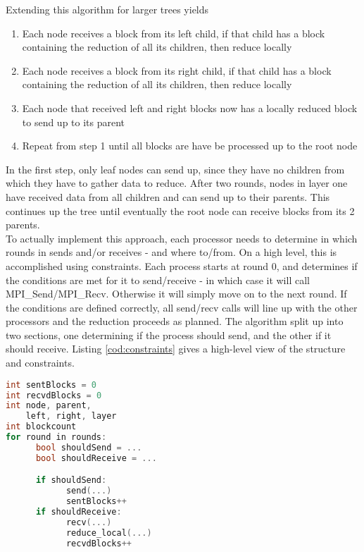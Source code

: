\documentclass[twoside,twocolumn,hidelinks]{article}
\begin{document}
Extending this algorithm for larger trees yields

\begin{enumerate}
      \item Each node receives a block from its left child, if that child has a block containing the reduction of all its children, then reduce locally
      \item Each node receives a block from its right child, if that child has a block containing the reduction of all its children, then reduce locally
      \item Each node that received left and right blocks now has a locally reduced block to send up to its parent 
      \item Repeat from step 1 until all blocks are have be processed up to the root node
\end{enumerate}

In the first step, only leaf nodes can send up, since they have no children from which they have to gather data to reduce. After two rounds, nodes in layer one have received data from all children and can send up to their parents. This continues up the tree until eventually the root node can receive blocks from its 2 parents. \\

To actually implement this approach, each processor needs to determine in which rounds in sends and/or receives - and where to/from. On a high level, this is accomplished using constraints. Each process starts at round 0, and determines if the conditions are met for it to send/receive - in which case it will call MPI\_Send/MPI\_Recv. Otherwise it will simply move on to the next round. If the conditions are defined correctly, all send/recv calls will line up with the other processors and the reduction proceeds as planned. The algorithm split up into two sections, one determining if the process should send, and the other if it should receive. Listing \ref{cod:constraints} gives a high-level view of the structure and constraints.

\begin{lstlisting}[label=cod:constraints,language=C++,caption=Constraint based implementation,captionpos=b]
int sentBlocks = 0
int recvdBlocks = 0
int node, parent, 
    left, right, layer
int blockcount
for round in rounds:
      bool shouldSend = ...
      bool shouldReceive = ...

      if shouldSend: 
            send(...)
            sentBlocks++
      if shouldReceive: 
            recv(...)
            reduce_local(...)
            recvdBlocks++

\end{lstlisting}
\end{document}
